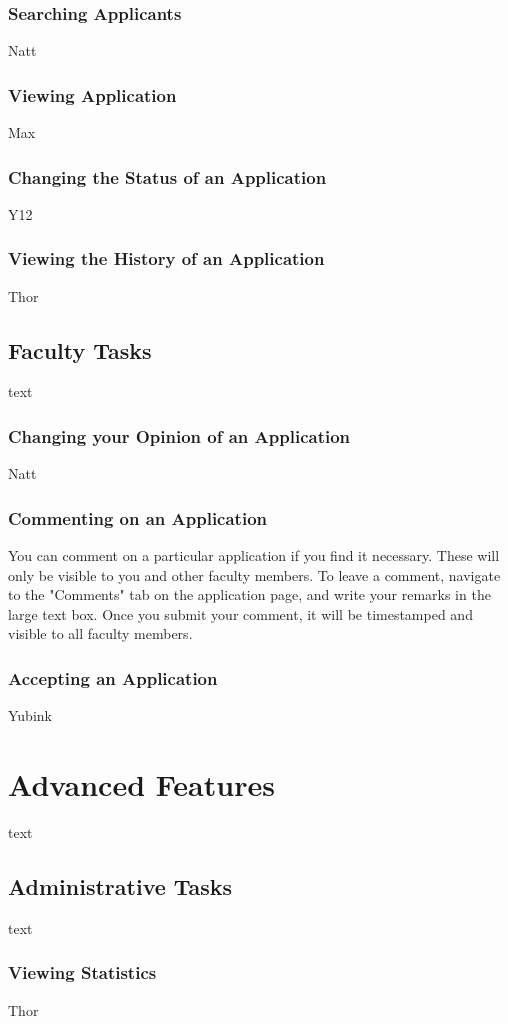 \documentclass[titlepage]{article}
\begin{document}
\subsubsection{Searching Applicants}
Natt
\subsubsection{Viewing Application}
Max
\subsubsection{Changing the Status of an Application}
Y12
\subsubsection{Viewing the History of an Application}
Thor
\subsection{Faculty Tasks}
text
\subsubsection{Changing your Opinion of an Application}
Natt
\subsubsection{Commenting on an Application}
You can comment on a particular application if you find it necessary.  These
will only be visible to you and other faculty members.  To leave a
comment, navigate to the "Comments" tab on the application page, and write
your remarks in the large text box.  Once you submit your comment, it will be
timestamped and visible to all faculty members.
\subsubsection{Accepting an Application}
Yubink


\section{Advanced Features}
text
\subsection{Administrative Tasks}
text
\subsubsection{Viewing Statistics}
Thor
\end{document}
